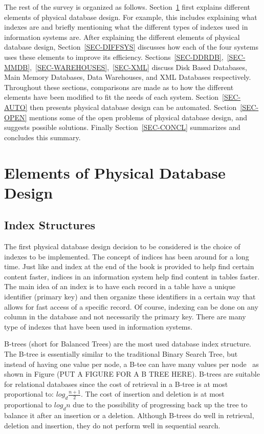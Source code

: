 \documentclass[12pt,a4paper]{article}
\begin{document}
The rest of the survey is organized as follows. Section~\ref{SEC-ELEMENTS} first explains different elements of physical database design. For example, this
includes explaining what indexes are and briefly mentioning what the different types of indexes used in information systems are. After explaining the different
elements of physical database design, Section~\ref{SEC-DIFFSYS} discusses how each of the four systems uses these elements to improve its efficiency.
Sections~\ref{SEC-DDRDB},~\ref{SEC-MMDB},~\ref{SEC-WAREHOUSES},~\ref{SEC-XML} discuss Disk Based Databases, Main Memory Databases, Data Warehouses, and XML
Databases respectively. Throughout these sections, comparisons are made as to how the different elements have been modified to fit the needs of each system.
Section~\ref{SEC-AUTO} then presents physical database design can be automated. Section~\ref{SEC-OPEN} mentions some of the open problems of physical database
design, and suggests possible solutions. Finally Section~\ref{SEC-CONCL} summarizes and concludes this summary.



\section{Elements of Physical Database Design}
\label{SEC-ELEMENTS}

\subsection{Index Structures}

The first physical database design decision to be considered is the choice of indexes to be implemented. The concept of indices has been around for a long time.
Just like and index at the end of the book is provided to help find certain content faster, indices in an information system help find content in tables faster.
The main idea of an index is to have each record in a table have a unique identifier (primary key) and then organize these identifiers in a certain way that
allows for fast access of a specific record. Of course, indexing can be done on any column in the database and not necessarily the primary key. There are many
type of indexes that have been used in information systems.

B-trees (short for Balanced Trees) are the most used database index structure.  The B-tree is essentially similar to the traditional Binary Search Tree, but
instead of having one value per node, a B-tee can have many values per node~\cite{comer1979ubiquitous} as shown in Figure (PUT A FIGURE FOR A B TREE HERE).
B-trees are suitable for relational databases since the cost of retrieval in a B-tree is at most proportional to: $log_{d}\frac{n+1}{2}$. The cost of insertion
and deletion is at most proportional to $log_{d}n$ due to the possibility of progressing back up the tree to balance it after an insertion or a deletion.
Although B-trees do well in retrieval, deletion and insertion, they do not perform well in sequential search. 
\end{document}
